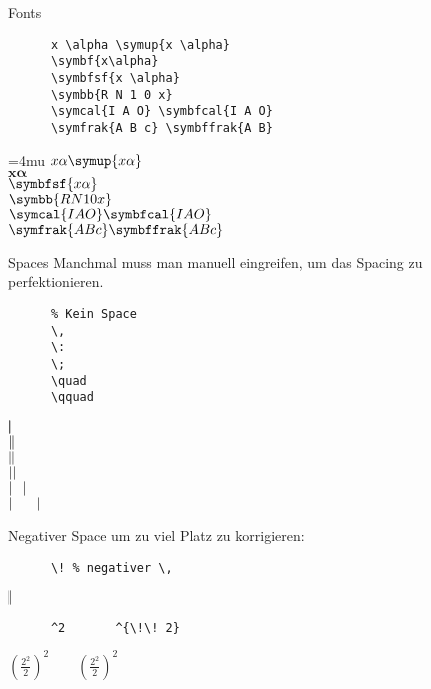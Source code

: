 \begin{frame}[fragile]{
  Fonts
  \hfill{}
}
  \begin{CodeExample}{0.70}
    \begin{lstlisting}
      x \alpha \symup{x \alpha}
      \symbf{x\alpha}
      \symbfsf{x \alpha}
      \symbb{R N 1 0 x}
      \symcal{I A O} \symbfcal{I A O}
      \symfrak{A B c} \symbffrak{A B}
    \end{lstlisting}
  \CodeResult
    \Umathordordspacing\textstyle=4mu
    $x \alpha \symup{x \alpha}$ \\
    $\symbf{x\alpha}$ \\
    $\symbfsf{x \alpha}$ \\
    $\symbb{R N 1 0 x}$ \\
    $\symcal{I A O} \symbfcal{I A O}$ \\
    $\symfrak{A B c} \symbffrak{A B c}$
  \end{CodeExample}
\end{frame}

\begin{frame}[fragile]{Spaces}
  Manchmal muss man manuell eingreifen, um das Spacing zu perfektionieren.
  \vspace{-1em}
  \begin{CodeExample}{0.48}
    \begin{lstlisting}
      % Kein Space
      \,
      \:
      \;
      \quad
      \qquad
    \end{lstlisting}
  \CodeResult
    $|\mspace{-5mu} |$ \\
    $|\mspace{-5mu} \,|$ \\
    $|\mspace{-5mu} \:|$ \\
    $|\mspace{-5mu} \;|$ \\
    $|\mspace{-5mu} \quad|$ \\
    $|\mspace{-5mu} \qquad|$ \\
  \end{CodeExample}
  Negativer Space um zu viel Platz zu korrigieren:
  \vspace{-1em}
  \begin{CodeExample}{0.48}
    \begin{lstlisting}
      \! % negativer \,
    \end{lstlisting}
  \CodeResult
    $|\mspace{-5mu} \!|$
  \end{CodeExample}
  \begin{CodeExample}{0.48}
    \begin{lstlisting}
      ^2       ^{\!\! 2}
    \end{lstlisting}
  \CodeResult
    $\displaystyle \left( \frac{2^2}{2} \right)^2
    \qquad \left( \frac{2^2}{2} \right)^{\!\! 2}$
  \end{CodeExample}
\end{frame}

